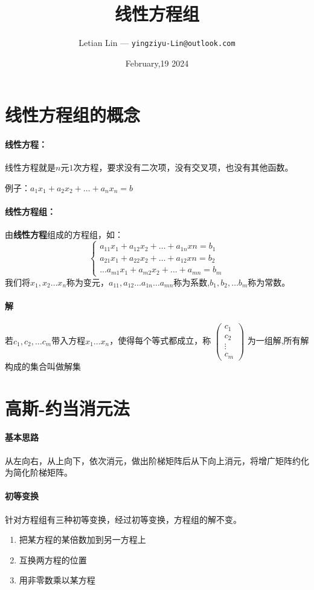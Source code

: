 \documentclass[UTF8]{ctexart}
\title{
	线性方程组
}
\author{
	Letian Lin --- \texttt{yingziyu-Lin@outlook.com}
}
\date{February,19 2024}
\begin{document}
\maketitle
\section{线性方程组的概念}
\paragraph{线性方程：}线性方程就是$n$元$1$次方程，要求没有二次项，没有交叉项，也没有其他函数。

例子：$a_1x_1+a_2x_2+\dots+a_nx_n=b$
\paragraph{线性方程组：}由\textbf{线性方程}组成的方程组，如：
$$\begin{cases}
	a_{11}x_1+a_{12}x_2+\dots+a_{1n}xn=b_1\\
	a_{21}x_1+a_{22}x_2+\dots+a_{12}xn=b_2\\
	...
	a_{m1}x_1+a_{m2}x_2+\dots+a_{mn}=b_m
\end{cases}$$
我们将$x_1,x_2\dots x_n$称为变元，$a_{11},a_{12}\dots a_{1n} \dots a_{mn}$称为系数,$b_1,b_2,\dots b_m$称为常数。

\paragraph{解}若$c_1,c_2,\dots c_m$带入方程$x_1\dots x_n$，使得每个等式都成立，称
$\begin{pmatrix}
	c_1\\
	c_2\\
\vdots\\
	c_m
\end{pmatrix}$
为一组解,所有解构成的集合叫做解集

\section{高斯-约当消元法}
\paragraph{基本思路}从左向右，从上向下，依次消元，做出阶梯矩阵后从下向上消元，将增广矩阵约化为简化阶梯矩阵。
\paragraph{初等变换}针对方程组有三种初等变换，经过初等变换，方程组的解不变。
\begin{enumerate}
	\item 把某方程的某倍数加到另一方程上\\
	\item 互换两方程的位置\\
	\item 用非零数乘以某方程
\end{enumerate}
\end{document}
